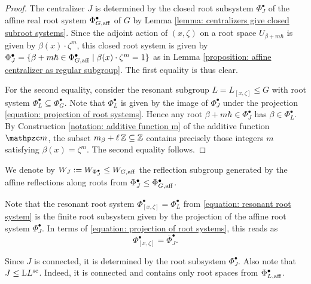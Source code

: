 \begin{proof} 
The centralizer $J$ is determined by the closed root subsystem $\Phi^{\bullet}_J$ of the affine real root system $\Phi^{\bullet}_{G, \mathrm{aff}}$ of $G$ by Lemma \ref{lemma: centralizers give closed subroot systems}. Since the adjoint action of $(x, \zeta)$ on a root space $U_{\beta + m\hbar}$ is given by $\beta(x)\cdot \zeta^m$, this closed root system is given by $\Phi^{\bullet}_J = \{ \beta + m\hbar \in \Phi^{\bullet}_{G, \mathrm{aff}} \mid \beta(x) \cdot \zeta^{m} = 1 \}$ as in Lemma \ref{proposition: affine centralizer as regular subgroup}. The first equality is thus clear.

For the second equality, consider the resonant subgroup $L=L_{[x, \zeta]} \leq G$ with root system $\Phi^{\bullet}_L \subseteq \Phi^{\bullet}_G$. Note that $\Phi^{\bullet}_{L}$ is given by the image of $\Phi^{\bullet}_J$ under the projection \eqref{equation: projection of root systems}. Hence any root $\beta +m\hbar \in \Phi^{\bullet}_J$ has $\beta\in \Phi^{\bullet}_L$.
By Construction \ref{notation: additive function m} of the additive function $\mm$, the subset $m_{\beta} + \ell \operatorname{\mathbb{Z}} \subseteq \operatorname{\mathbb{Z}}$ contains precisely those integers $m$ satisfying $\beta(x) = \zeta^m$. The second equality follows.
\end{proof}

\begin{notation}\label{notation: WJ}
We denote by $W_J := W_{\Phi^{\bullet}_J} \leq W_{G, \mathrm{aff}}$ the reflection subgroup generated by the affine reflections along roots from $\Phi^{\bullet}_J \leq \Phi^{\bullet}_{G, \mathrm{aff}}$.    
\end{notation}


\begin{remark}\label{remark: root system of J project on root system of L}
Note that the resonant root system $\Phi^{\bullet}_{[x, \zeta]} = \Phi^{\bullet}_L$ from \eqref{equation: resonant root system} is the finite root subsystem given by the projection of the affine root system $\Phi^{\bullet}_J$. In terms of \eqref{equation: projection of root systems}, this reads as
\begin{equation*}
   \Phi^{\bullet}_{[x, \zeta]} = \overline{\Phi}^{\bullet}_J.
\end{equation*}
\end{remark}

\begin{remark}
Since $J$ is connected, it is determined by the root subsystem $\Phi^{\bullet}_J$. Also note that $J \leq \mathrm{L} L^{\mathrm{sc}}$. Indeed, it is connected and contains only root spaces from $\Phi^{\bullet}_{L, \mathrm{aff}}$.    
\end{remark}





